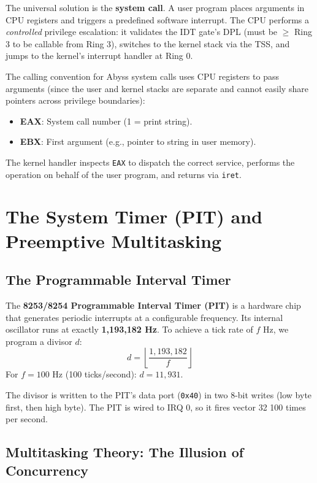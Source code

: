 \documentclass[12pt,a4paper]{report}
\begin{document}
The universal solution is the \textbf{system call}. A user program places arguments
in CPU registers and triggers a predefined software interrupt. The CPU performs a
\textit{controlled} privilege escalation: it validates the IDT gate's DPL (must be
$\geq$ Ring 3 to be callable from Ring 3), switches to the kernel stack via the TSS,
and jumps to the kernel's interrupt handler at Ring 0.

The calling convention for Abyss system calls uses CPU registers to pass arguments
(since the user and kernel stacks are separate and cannot easily share pointers
across privilege boundaries):
\begin{itemize}
    \item \textbf{EAX}: System call number (1 = print string).
    \item \textbf{EBX}: First argument (e.g., pointer to string in user memory).
\end{itemize}

The kernel handler inspects \texttt{EAX} to dispatch the correct service, performs
the operation on behalf of the user program, and returns via \texttt{iret}.

\section{The System Timer (PIT) and Preemptive Multitasking}

\subsection{The Programmable Interval Timer}

The \textbf{8253/8254 Programmable Interval Timer (PIT)} is a hardware chip that
generates periodic interrupts at a configurable frequency. Its internal oscillator
runs at exactly \textbf{1,193,182 Hz}. To achieve a tick rate of $f$ Hz, we program
a divisor $d$:
\[
d = \left\lfloor \frac{1{,}193{,}182}{f} \right\rfloor
\]
For $f = 100$ Hz (100 ticks/second): $d = 11{,}931$.

The divisor is written to the PIT's data port (\texttt{0x40}) in two 8-bit writes
(low byte first, then high byte). The PIT is wired to IRQ 0, so it fires vector 32 100 times per second.

\subsection{Multitasking Theory: The Illusion of Concurrency}
\end{document}
